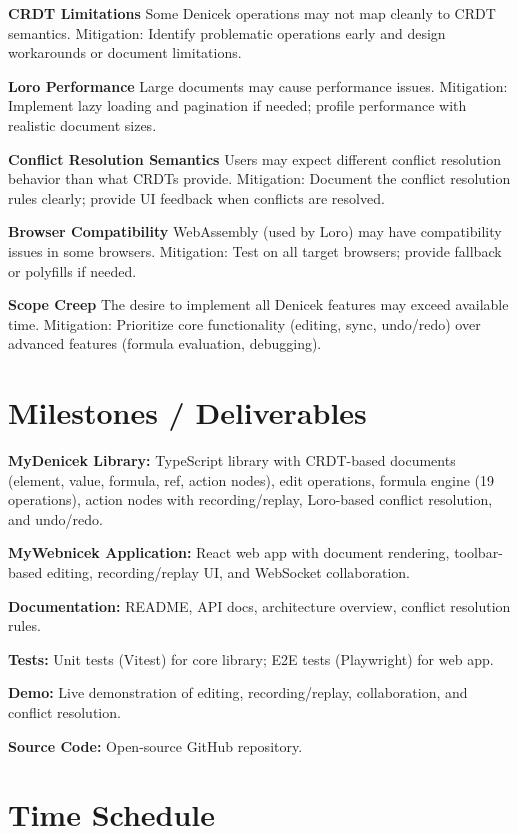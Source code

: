 \documentclass{article}
\begin{document}
\textbf{CRDT Limitations} Some Denicek operations may not map cleanly to CRDT semantics. Mitigation: Identify problematic operations early and design workarounds or document limitations.

\textbf{Loro Performance} Large documents may cause performance issues. Mitigation: Implement lazy loading and pagination if needed; profile performance with realistic document sizes.

\textbf{Conflict Resolution Semantics} Users may expect different conflict resolution behavior than what CRDTs provide. Mitigation: Document the conflict resolution rules clearly; provide UI feedback when conflicts are resolved.

\textbf{Browser Compatibility} WebAssembly (used by Loro) may have compatibility issues in some browsers. Mitigation: Test on all target browsers; provide fallback or polyfills if needed.

\textbf{Scope Creep} The desire to implement all Denicek features may exceed available time. Mitigation: Prioritize core functionality (editing, sync, undo/redo) over advanced features (formula evaluation, debugging).


\section{Milestones / Deliverables}

\textbf{MyDenicek Library:} TypeScript library with CRDT-based documents (element, value, formula, ref, action nodes), edit operations, formula engine (19 operations), action nodes with recording/replay, Loro-based conflict resolution, and undo/redo.

\textbf{MyWebnicek Application:} React web app with document rendering, toolbar-based editing, recording/replay UI, and WebSocket collaboration.

\textbf{Documentation:} README, API docs, architecture overview, conflict resolution rules.

\textbf{Tests:} Unit tests (Vitest) for core library; E2E tests (Playwright) for web app.

\textbf{Demo:} Live demonstration of editing, recording/replay, collaboration, and conflict resolution.

\textbf{Source Code:} Open-source GitHub repository.


\section{Time Schedule}
\end{document}

